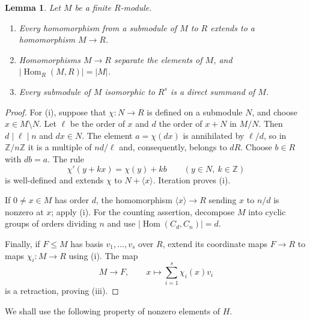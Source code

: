 \documentclass[11pt,reqno]{amsart}
\newtheorem{lemma}[theorem]{Lemma}
\theoremstyle{definition}
\numberwithin{equation}{section}
\newcommand{\Hom}{\operatorname{Hom}}
\newcommand{\Z}{\mathbb{Z}}
\renewcommand{\leq}{\leqslant}
\begin{document}
\begin{lemma}\label{lem:characters}
Let $M$ be a finite $R$-module.
\begin{enumerate}[label=\textup{(\roman*)},leftmargin=2.4em]
\item Every homomorphism from a submodule of $M$ to $R$ extends to a homomorphism $M\to R$.
\item Homomorphisms $M\to R$ separate the elements of $M$, and $|\Hom_R(M,R)|=|M|$.
\item Every submodule of $M$ isomorphic to $R^s$ is a direct summand of $M$.
\end{enumerate}
\end{lemma}
\begin{proof}
For (i), suppose that $\chi:N\to R$ is defined on a submodule $N$, and choose $x\in M\setminus N$. Let $\ell$ be the order of $x$ and $d$ the order of $x+N$ in $M/N$. Then $d\mid\ell\mid n$ and $dx\in N$. The element $a=\chi(dx)$ is annihilated by $\ell/d$, so in $\Z/n\Z$ it is a multiple of $nd/\ell$ and, consequently, belongs to $dR$. Choose $b\in R$ with $db=a$. The rule
\[
 \chi'(y+kx)=\chi(y)+kb\qquad(y\in N,\ k\in\Z)
\]
is well-defined and extends $\chi$ to $N+\langle x\rangle$. Iteration proves (i).

If $0\ne x\in M$ has order $d$, the homomorphism $\langle x\rangle\to R$ sending $x$ to $n/d$ is nonzero at $x$; apply (i). For the counting assertion, decompose $M$ into cyclic groups of orders dividing $n$ and use $|\Hom(C_d,C_n)|=d$.

Finally, if $F\leq M$ has basis $v_1,\ldots,v_s$ over $R$, extend its coordinate maps $F\to R$ to maps $\chi_i:M\to R$ using (i). The map
\[
 M\longrightarrow F,\qquad x\longmapsto\sum_{i=1}^{s}\chi_i(x)v_i
\]
is a retraction, proving (iii).
\end{proof}

We shall use the following property of nonzero elements of $H$.
\end{document}
